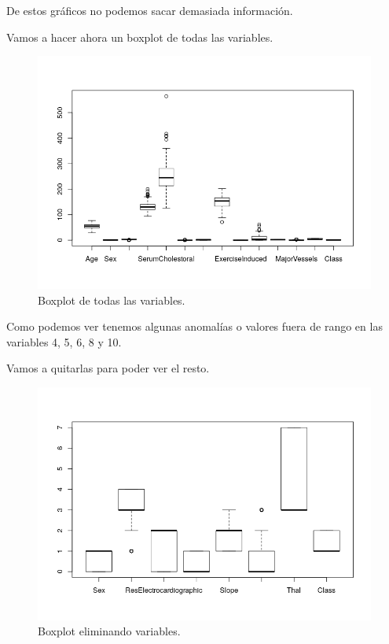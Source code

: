 \documentclass[12pt,a4paper]{article}
\begin{document}
De estos gráficos no podemos sacar demasiada información.

Vamos a hacer ahora un boxplot de todas las variables.

\begin{figure}[H]
	\centering
	\includegraphics[scale=0.7]{./Imagenes/EDA/Clasificacion/boxplot_todas.png}
	\caption{Boxplot de todas las variables.}
\end{figure}

Como podemos ver tenemos algunas anomalías o valores fuera de rango en las variables 4, 5, 6, 8 y 10.

Vamos a quitarlas para poder ver el resto.

\begin{figure}[H]
	\centering
	\includegraphics[scale=0.7]{./Imagenes/EDA/Clasificacion/boxplot_filtrado.png}
	\caption{Boxplot eliminando variables.}
\end{figure}
\end{document}
